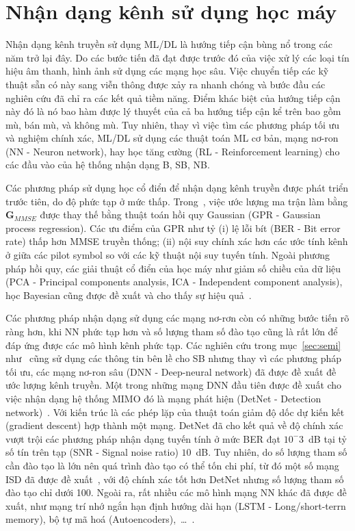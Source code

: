 \section{Nhận dạng kênh sử dụng học máy}

Nhận dạng kênh truyền sử dụng ML/DL là hướng tiếp cận bùng nổ trong các năm trở lại đây. Do các bước tiến đã đạt được trước đó của việc xử lý các loại tín hiệu âm thanh, hình ảnh sử dụng các mạng học sâu. Việc chuyển tiếp các kỹ thuật sẵn có này sang viễn thông được xảy ra nhanh chóng và bước đầu các nghiên cứu đã chỉ ra các kết quả tiềm năng. Điểm khác biệt của hướng tiếp cận này đó là nó bao hàm được lý thuyết của cả ba hướng tiếp cận kể trên bao gồm mù, bán mù, và không mù. Tuy nhiên, thay vì việc tìm các phương pháp tối ưu và nghiệm chính xác, ML/DL sử dụng các thuật toán ML cơ bản, mạng nơ-ron (NN - Neuron network), hay học tăng cường (RL - Reinforcement learning) cho các đầu vào của hệ thống nhận dạng B, SB, NB.

Các phương pháp sử dụng học cổ điển để nhận dạng kênh truyền được phát triển trước tiên, do độ phức tạp ở mức thấp. Trong~\cite{Simeon2022}, việc ước lượng ma trận làm bằng $\mathbf{G}_{MMSE}$ được thay thế bằng thuật toán hồi quy Gaussian (GPR - Gaussian process regression). Các ưu điểm của GPR như tỷ (i) lệ lỗi bít (BER - Bit error rate) thấp hơn MMSE truyền thống; (ii) nội suy chính xác hơn các ước tính kênh ở giữa các pilot symbol so với các kỹ thuật nội suy tuyến tính. Ngoài phương pháp hồi quy, các giải thuật cổ điển của học máy như giảm số chiều của dữ liệu (PCA - Principal components analysis, ICA - Independent component analysis), học Bayesian cũng được đề xuất và cho thấy sự hiệu quả~\cite{vilas2022}.

Các phương pháp nhận dạng sử dụng các mạng nơ-rơn còn có những bước tiến rõ ràng hơn, khi NN phức tạp hơn và số lượng tham số đào tạo cũng là rất lớn để đáp ứng được các mô hình kênh phức tạp. Các nghiên cứu trong mục~\ref{sec:semi} như~\cite{Lin2020, Wan2008} cũng sử dụng các thông tin bên lề cho SB nhưng thay vì các phương pháp tối ưu, các mạng nơ-ron sâu (DNN - Deep-neural network) đã được đề xuất đề ước lượng kênh truyền. Một trong những mạng DNN đầu tiên được đề xuất cho việc nhận dạng hệ thống MIMO đó là mạng phát hiện (DetNet - Detection network)~\cite{Samuel2019}. Với kiến trúc là các phép lặp của thuật toán giảm độ dốc dự kiến kết (gradient descent) hợp thành một mạng. DetNet đã cho kết quả về độ chính xác vượt trội các phương pháp nhận dạng tuyến tính ở mức BER đạt $10^-3$~dB tại tỷ số tín trên tạp (SNR - Signal noise ratio) $10$~dB. Tuy nhiên, do số lượng tham số cần đào tạo là lớn nên quá trình đào tạo có thể tốn chi phí, từ đó một số mạng ISD đã được đề xuất~\cite{Mandloi2017, Liao2020}, với độ chính xác tốt hơn DetNet nhưng số lượng tham số đào tạo chỉ dưới 100. Ngoài ra, rất nhiều các mô hình mạng NN khác đã được đề xuất, như mạng trí nhớ ngắn hạn định hướng dài hạn  (LSTM - Long/short-terrn memory), bộ tự mã hoá (Autoencoders),~\ldots~\cite{vilas2022}.

